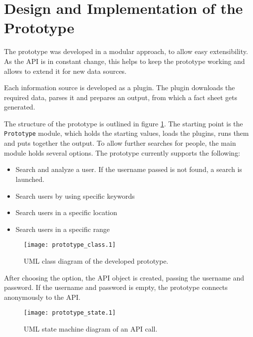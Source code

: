 \section{Design and Implementation of the Prototype}

The prototype was developed in a modular approach, to allow easy extensibility.
As the \Twitter{} API is in constant change, this helps to keep the prototype
working and allows to extend it for new data sources.

Each information source is developed as a plugin. The plugin downloads the
required data, parses it and prepares an output, from which a fact sheet gets
generated.

The structure of the prototype is outlined in figure \ref{fig:prototype_class}.
The starting point is the \texttt{Prototype} module, which holds the starting
values, loads the plugins, runs them and puts together the output. To allow
further searches for people, the main module holds several options. The
prototype currently supports the following:

\begin{itemize}
  \item Search and analyze a user. If the username passed is not found, a
  search is launched.
  \item Search users by using specific keywords
  \item Search users in a specific location
  \item Search users in a specific range
\end{itemize}

\begin{figure}[ht]
  \begin{center}
    \texttt{[image: prototype\_class.1]}
    \label{fig:prototype_class}
    \caption{UML class diagram of the developed prototype.}
  \end{center}
\end{figure}

After choosing the option, the API object is created, passing the username and
password. If the username and password is empty, the prototype connects
anonymously to the \Twitter{} API.

\begin{figure}[ht]
  \begin{center}
    \texttt{[image: prototype\_state.1]}
    \label{fig:prototype_state}
    \caption{UML state machine diagram of an \Twitter{} API call.}
  \end{center}
\end{figure}

